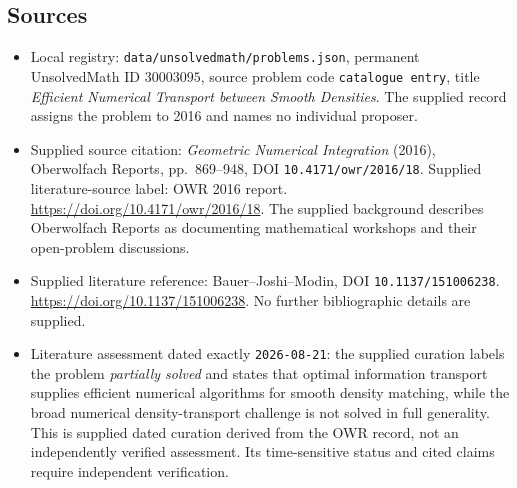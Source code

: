 \documentclass[11pt]{article}
\begin{document}
\subsection{Sources}
\begin{itemize}
\item Local registry: \texttt{data/unsolvedmath/problems.json}, permanent UnsolvedMath ID \(30003095\), source problem code \texttt{catalogue entry}, title \emph{Efficient Numerical Transport between Smooth Densities}. The supplied record assigns the problem to 2016 and names no individual proposer.
\item Supplied source citation: \emph{Geometric Numerical Integration} (2016), Oberwolfach Reports, pp.\ 869--948, DOI \texttt{10.4171/owr/2016/18}. Supplied literature-source label: OWR 2016 report. \url{https://doi.org/10.4171/owr/2016/18}. The supplied background describes Oberwolfach Reports as documenting mathematical workshops and their open-problem discussions.
\item Supplied literature reference: Bauer--Joshi--Modin, DOI \texttt{10.1137/151006238}. \url{https://doi.org/10.1137/151006238}. No further bibliographic details are supplied.
\item Literature assessment dated exactly \texttt{2026-08-21}: the supplied curation labels the problem \emph{partially solved} and states that optimal information transport supplies efficient numerical algorithms for smooth density matching, while the broad numerical density-transport challenge is not solved in full generality. This is supplied dated curation derived from the OWR record, not an independently verified assessment. Its time-sensitive status and cited claims require independent verification.
\end{itemize}
\end{document}
